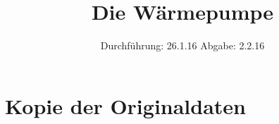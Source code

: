 

\subject{V 206}
\title{Die Wärmepumpe}
\date{
  Durchführung: 26.1.16
  \hspace{3em}
  Abgabe: 2.2.16
}



\maketitle
\thispagestyle{empty}
\tableofcontents
\newpage






\printbibliography

\appendix
\section{Kopie der Originaldaten}


